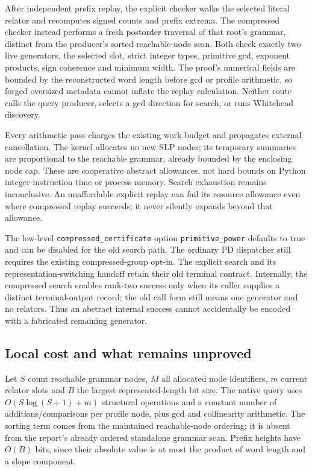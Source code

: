 After independent prefix replay, the explicit checker walks the selected
literal relator and recomputes signed counts and prefix extrema. The
compressed checker instead performs a fresh postorder traversal of that
root's grammar, distinct from the producer's sorted reachable-node scan.
Both check exactly two live generators, the selected slot, strict integer
types, primitive gcd, exponent products, sign coherence and minimum width.
The proof's numerical fields are bounded by the reconstructed word length
before gcd or profile arithmetic, so forged oversized metadata cannot
inflate the replay calculation. Neither route calls the query producer,
selects a gcd direction for search, or runs Whitehead discovery.

Every arithmetic pass charges the existing work budget and propagates
external cancellation. The kernel allocates no new SLP nodes; its temporary
summaries are proportional to the reachable grammar, already bounded by
the enclosing node cap. These are cooperative abstract allowances, not
hard bounds on Python integer-instruction time or process memory. Search
exhaustion remains inconclusive. An unaffordable explicit replay can fail
its resource allowance even where compressed replay succeeds; it never
silently expands beyond that allowance.

The low-level \texttt{compressed\_certificate} option
\texttt{primitive\_power} defaults to true and can be disabled for the old
search path. The ordinary PD dispatcher still requires the existing
compressed-group opt-in. The explicit search and its representation-switching
handoff retain their old terminal contract. Internally, the compressed
search enables rank-two success only when its caller supplies a distinct
terminal-output record; the old call form still means one generator and
no relators. Thus an abstract internal success cannot accidentally be
encoded with a fabricated remaining generator.

\subsection{Local cost and what remains unproved}

Let $S$ count reachable grammar nodes, $M$ all allocated node identifiers,
$m$ current relator slots and $B$ the largest represented-length bit size.
The native query uses $O(S\log(S+1)+m)$ structural operations and a
constant number of additions/comparisons per profile node, plus gcd and
collinearity arithmetic. The sorting term comes from the maintained
reachable-node ordering; it is absent from the report's already ordered
standalone grammar scan. Prefix heights have $O(B)$ bits, since their
absolute value is at most the product of word length and a slope component.


